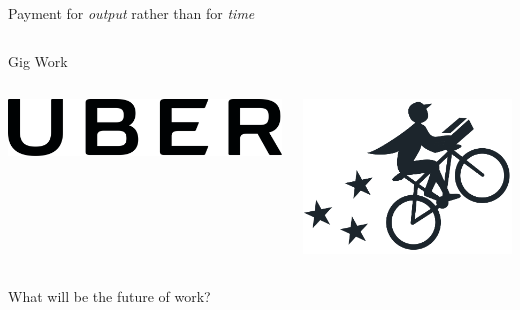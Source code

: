 \documentclass[presentation]{subfiles}
\begin{document}
\begin{frame}[t]{Payment for \emph{output} rather than for \emph{time}}
{\begin{columns}[b]
      \begin{column}[t]{0.45\textwidth}
        \centering
        Gig Work
        \begin{columns}
          \begin{column}{.5\textwidth}
            \includegraphics[max width=\linewidth,max height=\textheight,keepaspectratio]{figures/uber.png}
          \end{column}
          \begin{column}{.5\textwidth}
            \includegraphics[max width=\linewidth,max height=\textheight,keepaspectratio]{figures/postmates.png}
          \end{column}
        \end{columns}
      \end{column}
    \end{columns}
  }
\end{frame}


\begin{frame}[standout]
    What will be the future of work?
\end{frame}
\end{document}
